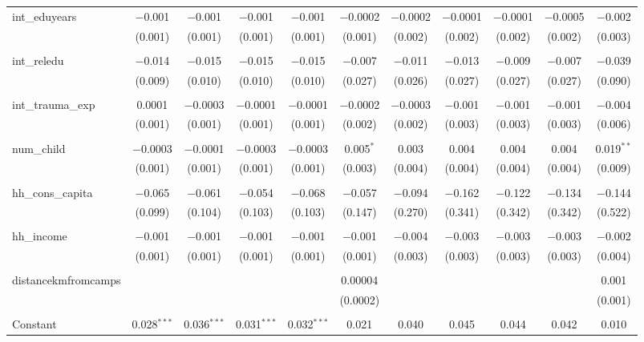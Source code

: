 \begin{table}[H]
\begin{tabular}{@{\extracolsep{4pt}}lcccccccccc}
 int\_eduyears & $-$0.001 & $-$0.001 & $-$0.001 & $-$0.001 & $-$0.0002 & $-$0.0002 & $-$0.0001 & $-$0.0001 & $-$0.0005 & $-$0.002 \\ 
  & (0.001) & (0.001) & (0.001) & (0.001) & (0.001) & (0.002) & (0.002) & (0.002) & (0.002) & (0.003) \\ 
  & & & & & & & & & & \\ 
 int\_reledu & $-$0.014 & $-$0.015 & $-$0.015 & $-$0.015 & $-$0.007 & $-$0.011 & $-$0.013 & $-$0.009 & $-$0.007 & $-$0.039 \\ 
  & (0.009) & (0.010) & (0.010) & (0.010) & (0.027) & (0.026) & (0.027) & (0.027) & (0.027) & (0.090) \\ 
  & & & & & & & & & & \\ 
 int\_trauma\_exp & 0.0001 & $-$0.0003 & $-$0.0001 & $-$0.0001 & $-$0.0002 & $-$0.0003 & $-$0.001 & $-$0.001 & $-$0.001 & $-$0.004 \\ 
  & (0.001) & (0.001) & (0.001) & (0.001) & (0.002) & (0.002) & (0.003) & (0.003) & (0.003) & (0.006) \\ 
  & & & & & & & & & & \\ 
 num\_child & $-$0.0003 & $-$0.0001 & $-$0.0003 & $-$0.0003 & 0.005$^{*}$ & 0.003 & 0.004 & 0.004 & 0.004 & 0.019$^{**}$ \\ 
  & (0.001) & (0.001) & (0.001) & (0.001) & (0.003) & (0.004) & (0.004) & (0.004) & (0.004) & (0.009) \\ 
  & & & & & & & & & & \\ 
 hh\_cons\_capita & $-$0.065 & $-$0.061 & $-$0.054 & $-$0.068 & $-$0.057 & $-$0.094 & $-$0.162 & $-$0.122 & $-$0.134 & $-$0.144 \\ 
  & (0.099) & (0.104) & (0.103) & (0.103) & (0.147) & (0.270) & (0.341) & (0.342) & (0.342) & (0.522) \\ 
  & & & & & & & & & & \\ 
 hh\_income & $-$0.001 & $-$0.001 & $-$0.001 & $-$0.001 & $-$0.001 & $-$0.004 & $-$0.003 & $-$0.003 & $-$0.003 & $-$0.002 \\ 
  & (0.001) & (0.001) & (0.001) & (0.001) & (0.001) & (0.003) & (0.003) & (0.003) & (0.003) & (0.004) \\ 
  & & & & & & & & & & \\ 
 distancekmfromcamps &  &  &  &  & 0.00004 &  &  &  &  & 0.001 \\ 
  &  &  &  &  & (0.0002) &  &  &  &  & (0.001) \\ 
  & & & & & & & & & & \\ 
 Constant & 0.028$^{***}$ & 0.036$^{***}$ & 0.031$^{***}$ & 0.032$^{***}$ & 0.021 & 0.040 & 0.045 & 0.044 & 0.042 & 0.010 \\ 

\end{tabular}
\end{table}

